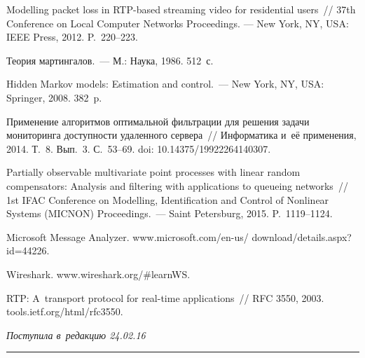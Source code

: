 \begin{multicols}{2}
{{\begin{thebibliography}{99}
 Modelling
packet loss in RTP-based streaming video for residential users~//
{37th Conference on Local Computer Networks Proceedings.} --- New York, NY, USA:
IEEE Press, 2012. P.~220--223.



 Теория мартингалов.~--- М.: Наука,
1986. 512~с.

 {Hidden Markov models:
Estimation and control.}~--- New York, NY, USA: Springer, 2008. 382~p.

 Применение алгоритмов оптимальной фильтрации для
решения задачи мониторинга доступности удаленного сервера~//
{Информатика и~её применения, 2014.} Т.~8. Вып.~3. С.~53--69.
doi: 10.14375/19922264140307.

 Partially observable multivariate point processes
with linear random compensators: Analysis and filtering with
applications to queueing networks~// {1st IFAC Conference on
Modelling, Identification and Control of Nonlinear Systems (MICNON)
Proceedings.}~--- Saint Petersburg, 2015. P.~1119--1124.

Microsoft Message Analyzer. 
{\sf www.microsoft.com/en-us/ download/details.aspx?id=44226}.

Wireshark. {\sf www.wireshark.org/\#learnWS}.

 RTP: 
A~transport protocol for real-time applications~// {RFC} 3550, 2003.
{\sf tools.ietf.org/html/rfc3550}.
\end{thebibliography}

 }
 }

\end{multicols}

\vspace*{-3pt}

\hfill{\small\textit{Поступила в~редакцию 24.02.16}}

\vspace*{8pt}



\hrule

\vspace*{2pt}

